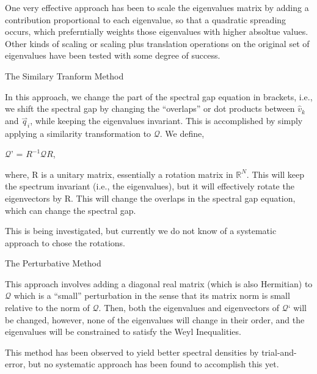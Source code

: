 \documentclass{article}
\begin{document}
One very effective approach has been to scale the eigenvalues matrix by adding a contribution proportional to each eigenvalue, so that a quadratic
spreading occurs, which preferntially weights those eigenvalues with higher absoltue values. Other kinds of scaling or scaling plus translation operations
on the original set of eigenvalues have been tested with some degree of success.

The Similary Tranform Method

In this approach, we change the part of the spectral gap equation in brackets, i.e., we shift the spectral gap by changing the {``}overlaps{''} or
dot products between { }\(\hat{v}_k\) and \(\overset{\rightharpoonup }{q}_i\), while keeping the eigenvalues invariant. { }This is accomplished by
simply applying a similarity transformation to $\mathcal{Q}$. { }We define,

$\mathcal{Q}${'} = \(R^{-1}\mathcal{Q} R\),

where, R is a unitary matrix, essentially a rotation matrix in \(\mathbb{R}^N\). This will keep the spectrum invariant (i.e., the eigenvalues), but
it will effectively rotate the eigenvectors by R. { }This will change the overlaps in the spectral gap equation, which can change the spectral gap.


This is being investigated, but currently we do not know of a systematic approach to chose the rotations.

The Perturbative Method

This approach involves adding a diagonal real matrix (which is also Hermitian) { }to $\mathcal{Q}$ { }which is a {``}small{''} perturbation in the
sense that its matrix norm is small relative to the norm of $\mathcal{Q}$. { }Then, both the eigenvalues and eigenvectors of $\mathcal{Q}${`} will
be changed, however, none of the eigenvalues will change in their order, and the eigenvalues will be constrained to satisfy the Weyl Inequalities.
{ }

This method has been observed to yield better spectral densities by trial-and-error, but no systematic approach has been found to accomplish this
yet.
\end{document}
